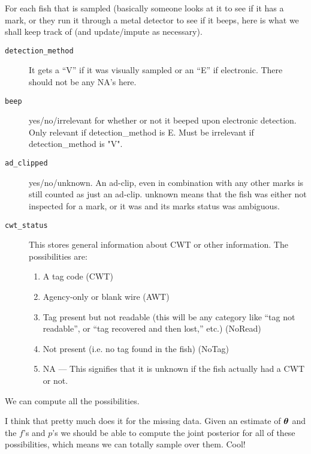 \documentclass[11pt]{article}
\def\bm#1{\mathpalette\bmstyle{#1}}
\def\bmstyle#1#2{\mbox{\boldmath$#1#2$}}
\newcommand{\btheta}{\bm{\theta}}
\begin{document}
For each fish that is sampled (basically someone looks at it to see if it has a mark, or they
run it through a metal detector to see if it beeps, here is what we shall keep track of (and
update/impute as necessary).

\begin{description}
	\item [{\tt detection\_method}]  It gets a ``V'' if it was visually sampled or an ``E'' if electronic.  There should
	not be any NA's here.
	\item [{\tt beep}] yes/no/irrelevant for whether or not it beeped upon electronic detection. Only relevant if detection\_method is E.  Must be irrelevant if
	detection\_method is "V".
	\item [{\tt ad\_clipped}]  yes/no/unknown.  An ad-clip, even in combination with any other marks is still counted
	as just an ad-clip.  unknown means that the fish was either not
	inspected for a mark, or it was and its marks status was ambiguous.
	\item [{\tt cwt\_status}] This stores general information about CWT or other information.  The possibilities are:
	\begin{enumerate}
		\item A tag code (CWT)
		\item Agency-only or blank wire (AWT)
		\item Tag present but not readable (this will be any category like ``tag not readable'', or ``tag
		recovered and then lost,'' etc.) (NoRead)
		\item Not present (i.e. no tag found in the fish)  (NoTag)
		\item NA --- This signifies that it is unknown if the fish actually had a CWT or not.
	\end{enumerate}

\end{description}


We can compute all the possibilities.



I think that pretty much does it for the missing data.  Given an estimate of $\btheta$ and the $f$'s and $p$'s we should be able to compute the joint posterior for all of these possibilities, which means
we can totally sample over them.  Cool!

\end{document}
